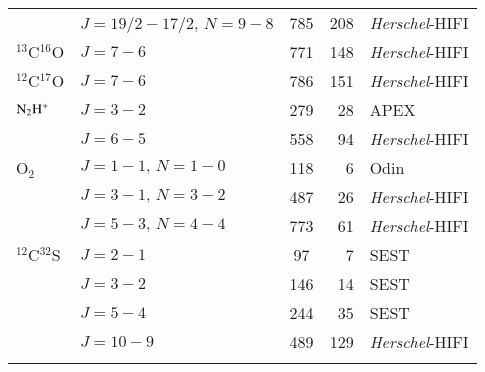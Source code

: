 \documentclass{aa}
\newcommand{\molo}{O$_{2}$}                     %
\newcommand{\ntwohp}{${\rm N_2H^+}$}
\begin{document}
\begin{table}[h]
\begin{tabular}{llcrl}
                                & $J=19/2-17/2$, $N=9-8$                        & 785                     & 208   & {\it Herschel}-HIFI   \\                              
$^{13}$C$^{16}$O        &$J=7-6$                                                        & 771                     & 148   & {\it Herschel}-HIFI   \\
$^{12}$C$^{17}$O        &$J=7-6$                                                        & 786                     & 151   &  {\it Herschel}-HIFI  \\      
\ntwohp                 &$J=3-2$                                                        & 279                     &   28  & APEX \\
                                &$J=6-5$                                                        & 558                     &   94  & {\it Herschel}-HIFI   \\
\molo                   &$J=1-1,\,N=1-0$                                        & 118                     &     6 & Odin \\
                                &$J=3-1,\,N=3-2$                                        & 487                     &   26  &  {\it Herschel}-HIFI  \\
                                &$J=5-3,\,N=4-4$                                        & 773                     &   61  & {\it Herschel}-HIFI   \\
$^{12}$C$^{32}$S        & $J=2-1$                                                       &   97                    &    7          &  SEST  \\
                                & $J=3-2$                                                       & 146                     &  14           &  SEST \\      
                                & $J=5-4$                                                       & 244                     &  35   &  SEST \\
                                &$J=10-9$                                               & 489                     &129            & {\it Herschel}-HIFI   \\
\noalign{\smallskip}    
\hline                                   %
\end{tabular}
\end{table}                     


%
%
\end{document}
